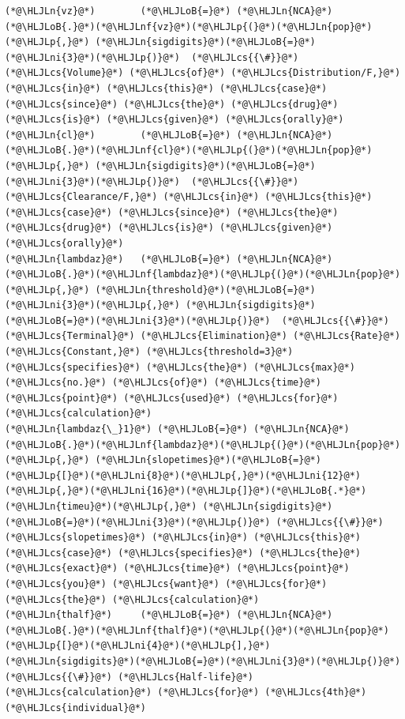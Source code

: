 \documentclass[12pt,a4paper]{article}
\newcommand{\HLJLn}[1]{#1}
\newcommand{\HLJLnf}[1]{\textcolor[RGB]{66,102,213}{#1}}
\newcommand{\HLJLni}[1]{\textcolor[RGB]{59,151,46}{#1}}
\newcommand{\HLJLoB}[1]{\textcolor[RGB]{102,102,102}{\textbf{#1}}}
\newcommand{\HLJLp}[1]{#1}
\newcommand{\HLJLcs}[1]{\textcolor[RGB]{153,153,119}{\textit{#1}}}
\begin{document}
\begin{lstlisting}
(*@\HLJLn{vz}@*)        (*@\HLJLoB{=}@*) (*@\HLJLn{NCA}@*)(*@\HLJLoB{.}@*)(*@\HLJLnf{vz}@*)(*@\HLJLp{(}@*)(*@\HLJLn{pop}@*)(*@\HLJLp{,}@*) (*@\HLJLn{sigdigits}@*)(*@\HLJLoB{=}@*)(*@\HLJLni{3}@*)(*@\HLJLp{)}@*)  (*@\HLJLcs{{\#}}@*) (*@\HLJLcs{Volume}@*) (*@\HLJLcs{of}@*) (*@\HLJLcs{Distribution/F,}@*) (*@\HLJLcs{in}@*) (*@\HLJLcs{this}@*) (*@\HLJLcs{case}@*) (*@\HLJLcs{since}@*) (*@\HLJLcs{the}@*) (*@\HLJLcs{drug}@*) (*@\HLJLcs{is}@*) (*@\HLJLcs{given}@*) (*@\HLJLcs{orally}@*)
(*@\HLJLn{cl}@*)        (*@\HLJLoB{=}@*) (*@\HLJLn{NCA}@*)(*@\HLJLoB{.}@*)(*@\HLJLnf{cl}@*)(*@\HLJLp{(}@*)(*@\HLJLn{pop}@*)(*@\HLJLp{,}@*) (*@\HLJLn{sigdigits}@*)(*@\HLJLoB{=}@*)(*@\HLJLni{3}@*)(*@\HLJLp{)}@*)  (*@\HLJLcs{{\#}}@*) (*@\HLJLcs{Clearance/F,}@*) (*@\HLJLcs{in}@*) (*@\HLJLcs{this}@*) (*@\HLJLcs{case}@*) (*@\HLJLcs{since}@*) (*@\HLJLcs{the}@*) (*@\HLJLcs{drug}@*) (*@\HLJLcs{is}@*) (*@\HLJLcs{given}@*) (*@\HLJLcs{orally}@*)
(*@\HLJLn{lambdaz}@*)   (*@\HLJLoB{=}@*) (*@\HLJLn{NCA}@*)(*@\HLJLoB{.}@*)(*@\HLJLnf{lambdaz}@*)(*@\HLJLp{(}@*)(*@\HLJLn{pop}@*)(*@\HLJLp{,}@*) (*@\HLJLn{threshold}@*)(*@\HLJLoB{=}@*)(*@\HLJLni{3}@*)(*@\HLJLp{,}@*) (*@\HLJLn{sigdigits}@*)(*@\HLJLoB{=}@*)(*@\HLJLni{3}@*)(*@\HLJLp{)}@*)  (*@\HLJLcs{{\#}}@*) (*@\HLJLcs{Terminal}@*) (*@\HLJLcs{Elimination}@*) (*@\HLJLcs{Rate}@*) (*@\HLJLcs{Constant,}@*) (*@\HLJLcs{threshold=3}@*) (*@\HLJLcs{specifies}@*) (*@\HLJLcs{the}@*) (*@\HLJLcs{max}@*) (*@\HLJLcs{no.}@*) (*@\HLJLcs{of}@*) (*@\HLJLcs{time}@*) (*@\HLJLcs{point}@*) (*@\HLJLcs{used}@*) (*@\HLJLcs{for}@*) (*@\HLJLcs{calculation}@*)
(*@\HLJLn{lambdaz{\_}1}@*) (*@\HLJLoB{=}@*) (*@\HLJLn{NCA}@*)(*@\HLJLoB{.}@*)(*@\HLJLnf{lambdaz}@*)(*@\HLJLp{(}@*)(*@\HLJLn{pop}@*)(*@\HLJLp{,}@*) (*@\HLJLn{slopetimes}@*)(*@\HLJLoB{=}@*)(*@\HLJLp{[}@*)(*@\HLJLni{8}@*)(*@\HLJLp{,}@*)(*@\HLJLni{12}@*)(*@\HLJLp{,}@*)(*@\HLJLni{16}@*)(*@\HLJLp{]}@*)(*@\HLJLoB{.*}@*)(*@\HLJLn{timeu}@*)(*@\HLJLp{,}@*) (*@\HLJLn{sigdigits}@*)(*@\HLJLoB{=}@*)(*@\HLJLni{3}@*)(*@\HLJLp{)}@*) (*@\HLJLcs{{\#}}@*) (*@\HLJLcs{slopetimes}@*) (*@\HLJLcs{in}@*) (*@\HLJLcs{this}@*) (*@\HLJLcs{case}@*) (*@\HLJLcs{specifies}@*) (*@\HLJLcs{the}@*) (*@\HLJLcs{exact}@*) (*@\HLJLcs{time}@*) (*@\HLJLcs{point}@*) (*@\HLJLcs{you}@*) (*@\HLJLcs{want}@*) (*@\HLJLcs{for}@*) (*@\HLJLcs{the}@*) (*@\HLJLcs{calculation}@*)
(*@\HLJLn{thalf}@*)     (*@\HLJLoB{=}@*) (*@\HLJLn{NCA}@*)(*@\HLJLoB{.}@*)(*@\HLJLnf{thalf}@*)(*@\HLJLp{(}@*)(*@\HLJLn{pop}@*)(*@\HLJLp{[}@*)(*@\HLJLni{4}@*)(*@\HLJLp{],}@*) (*@\HLJLn{sigdigits}@*)(*@\HLJLoB{=}@*)(*@\HLJLni{3}@*)(*@\HLJLp{)}@*) (*@\HLJLcs{{\#}}@*) (*@\HLJLcs{Half-life}@*) (*@\HLJLcs{calculation}@*) (*@\HLJLcs{for}@*) (*@\HLJLcs{4th}@*) (*@\HLJLcs{individual}@*)

\end{lstlisting}
\end{document}
